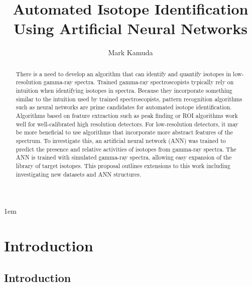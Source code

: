 \documentclass[tocnosub,noragright,centerchapter,12pt,fullpage]{uiucecethesis09}
\title{Automated Isotope Identification Using Artificial Neural Networks}
\author{Mark Kamuda}
\begin{document}
%

%
\maketitle

\parindent 1em%

\frontmatter


\begin{abstract}


There is a need to develop an algorithm that can identify and quantify isotopes in low-resolution gamma-ray spectra. Trained gamma-ray spectroscopists typically rely on intuition when identifying isotopes in spectra. Because they incorporate something similar to the intuition used by trained spectroscopists, pattern recognition algorithms such as neural networks are prime candidates for automated isotope identification. Algorithms based on feature extraction such as peak finding or ROI algorithms work well for well-calibrated high resolution detectors. For low-resolution detectors, it may be more beneficial to use algorithms that incorporate more abstract features of the spectrum. To investigate this, an artificial neural network (ANN) was trained to predict the presence and relative activities of isotopes from gamma-ray spectra. The ANN is trained with simulated gamma-ray spectra, allowing easy expansion of the library of target isotopes. This proposal outlines extensions to this work including investigating new datasets and ANN structures.

\end{abstract}

\tableofcontents

\listoftables

\listoffigures

\mainmatter








\chapter{Introduction} \label{LiteratureReview}

\section{Introduction}
\end{document}
